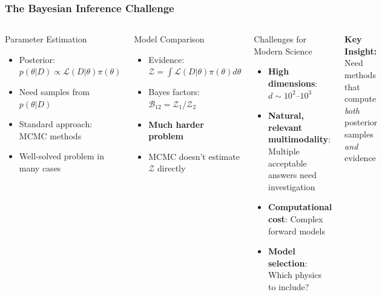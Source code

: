 \documentclass[aspectratio=169]{beamer}
\begin{document}
\begin{frame}
    \frametitle{The Bayesian Inference Challenge}
    \begin{columns}
        \begin{block}{Parameter Estimation}
            \begin{itemize}
                \item Posterior: $p(\theta|D) \propto \mathcal{L}(D|\theta) \pi(\theta)$
                \item Need samples from $p(\theta|D)$
                \item Standard approach: MCMC methods
                \item Well-solved problem in many cases
            \end{itemize}
        \end{block}
        \begin{block}{Model Comparison}
            \begin{itemize}
                \item Evidence: $\mathcal{Z} = \int \mathcal{L}(D|\theta) \pi(\theta) d\theta$
                \item Bayes factors: $\mathcal{B}_{12} = \mathcal{Z}_1 / \mathcal{Z}_2$
                \item \textbf{Much harder problem}
                \item MCMC doesn't estimate $\mathcal{Z}$ directly
            \end{itemize}
        \end{block}
        \begin{block}{Challenges for Modern Science}
            \begin{itemize}
                \item \textbf{High dimensions}: $d \sim 10^2$--$10^3$
                \item \textbf{Natural, relevant multimodality}: Multiple acceptable answers need investigation
                \item \textbf{Computational cost}: Complex forward models
                \item \textbf{Model selection}: Which physics to include?
            \end{itemize}
        \end{block}
        \begin{center}
            \textbf{Key Insight:}\\
            Need methods that compute \emph{both} \\
            posterior samples \emph{and} evidence
        \end{center}
    \end{columns}
\end{frame}
\end{document}
